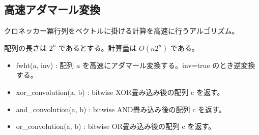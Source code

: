 \subsection{高速アダマール変換}
クロネッカー冪行列をベクトルに掛ける計算を高速に行うアルゴリズム。

配列の長さは $2^n$ であるとする。計算量は $O(n 2^n)$ である。

\begin{itemize}
    \item fwht(a, inv) : 配列 $a$ を高速にアダマール変換する。inv=true のとき逆変換する。
    \item xor\_convolution(a, b) : bitwise XOR畳み込み後の配列 c を返す。
    \item and\_convolution(a, b) : bitwise AND畳み込み後の配列 c を返す。
    \item or\_convolution(a, b) : bitwise OR畳み込み後の配列 c を返す。
\end{itemize}
